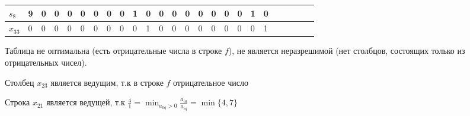 \documentclass[a4paper]{article}
\theoremstyle{definition}
\theoremstyle{remark}
\begin{document}
\begin{table}[h]
\begin{tabular}{|l|l|l|l|l|l|l|l|l|l|l|l|l|l|l|l|l|l|l|l|l|l|l|l|l|}
		$s_8$    & 9     & 0        & 0        & 0        & 0        & 0        & 0        & 0        & 1        & 0        & 0     & 0     & 0     & 0     & 0     & 0     & 0     & 1     & 0     \\ \hline
		$x_{33}$ & 0     & 0        & 0        & 0        & 0        & 0        & 0        & 0        & 0        & 1        & 0     & 0     & 0     & 0     & 0     & 0     & 0     & 0     & 1     \\ \hline
	\end{tabular}
\end{table}
Таблица не оптимальна (есть отрицательные числа в строке $f$), не является неразрешимой (нет столбцов, состоящих только из отрицательных чисел).

Столбец $x_{23}$ является ведущим, т.к в строке $f$ отрицательное число

Строка $x_{21}$ является ведущей, т.к $\frac{4}{1} = \min_{a_{0q}>0} \frac{a_{i0}}{a_{iq}} = \min \{4, 7\}$
\end{document}
